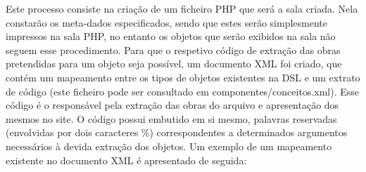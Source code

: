 \documentclass[letterpaper]{article}
\begin{document}
{
Este processo consiste na cria\c{c}\~ao de um ficheiro PHP que ser\'a a
sala criada. Nela constar\~ao os meta-dados especificados, sendo que
estes ser\~ao simplesmente impressos na sala PHP, no entanto os objetos
que ser\~ao exibidos na sala n\~ao seguem esse procedimento. Para que o
respetivo c\'odigo de extra\c{c}\~ao das obras pretendidas para um
objeto seja poss\'ivel, um documento XML foi criado, que cont\'em um
mapeamento entre os tipos de objetos existentes na DSL e um extrato de
c\'odigo (este ficheiro pode ser consultado em
componentes/conceitos.xml). Esse c\'odigo \'e o respons\'avel pela
extra\c{c}\~ao das obras do arquivo e apresenta\c{c}\~ao dos mesmos no
site. O c\'odigo possui embutido em si mesmo, palavras reservadas
(envolvidas por dois caracteres {\textquotesingle}\%{\textquotesingle})
correspondentes a determinados argumentos necess\'arios \`a devida
extra\c{c}\~ao dos objetos. Um exemplo de um mapeamento existente no
documento XML \'e apresentado de seguida:}
\end{document}
